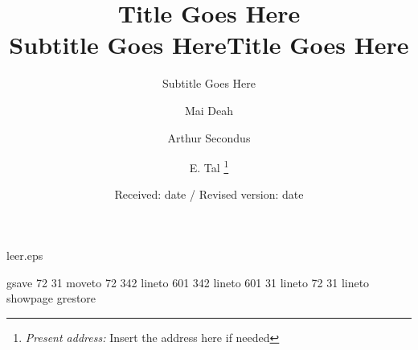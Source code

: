 %
\begin{filecontents}{leer.eps}

gsave
72 31 moveto
72 342 lineto
601 342 lineto
601 31 lineto
72 31 lineto
showpage
grestore
\end{filecontents}
%
\documentclass[epj]{svjour}
\date{}
\title{Title Goes Here\\\medskip
\large Subtitle Goes Here}


%
\title{Title Goes Here}
\subtitle{Subtitle Goes Here}
\author{Mai Deah \and Arthur Secondus \and E. Tal%
\thanks{\emph{Present address:} Insert the address here if needed}%
}                     %
%
\offprints{}          %
%
%
\date{Received: date / Revised version: date}
%
%
\maketitle

\section*{Introduction}
\label{sec:org90cee2c}

Lorem ipsum dolor sit amet, consectetur adipiscing elit, sed do eiusmod tempor incididunt ut labore et dolore magna aliqua. Ut enim ad minim veniam, quis nostrud exercitation ullamco laboris nisi ut aliquip ex ea commodo consequat. Duis aute irure dolor in reprehenderit in voluptate velit esse cillum dolore eu fugiat nulla pariatur. Excepteur sint occaecat cupidatat non proident, sunt in culpa qui officia deserunt mollit anim id est laborum.

